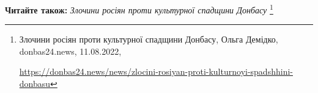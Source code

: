  
 
 
 
 

\textbf{Читайте також:} \emph{Злочини росіян проти культурної спадщини Донбасу}%
\footnote{Злочини росіян проти культурної спадщини Донбасу, Ольга Демідко, donbas24.news, 11.08.2022, \par%
\url{https://donbas24.news/news/zlocini-rosiyan-proti-kulturnoyi-spadshhini-donbasu}%
}
